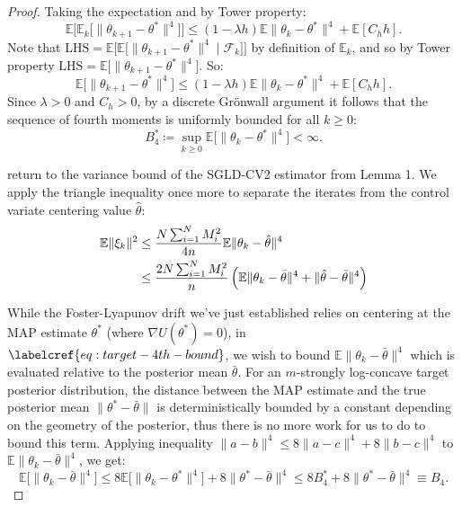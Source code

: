 \begin{proof}
Taking the expectation and by Tower property:
\begin{equation}
     \mathbb{E}\big[\mathbb{E}_k\big[\|\theta_{k+1} - \theta^*\|^4\big]\big] \leq (1 - \lambda h)\mathbb{E}\|\theta_k - \theta^*\|^4 + \mathbb{E}[C_h h].
\end{equation}
Note that LHS$=\mathbb{E}\big[\mathbb{E}\big[\|\theta_{k+1} - \theta^*\|^4 \mid \mathcal{F}_k\big]\big]$ by definition of $\mathbb{E}_k$, and so by Tower property $\text{LHS}=\mathbb{E}\big[\|\theta_{k+1} - \theta^*\|^4 \big]$. So:
\begin{equation}
     \mathbb{E}\big[\|\theta_{k+1} - \theta^*\|^4 \big] \leq (1 - \lambda h)\mathbb{E}\|\theta_k - \theta^*\|^4 + \mathbb{E}[C_h h].
\end{equation}
Since $\lambda > 0$ and $C_h > 0$, by a discrete Gr\"onwall argument it follows that the sequence of fourth moments is uniformly bounded for all $k \geq 0$:
\begin{equation}
    B_4^* \coloneqq \sup_{k \geq 0} \mathbb{E}\big[\|\theta_k - \theta^*\|^4\big] < \infty.
\end{equation}

return to the variance bound of the SGLD-CV2 estimator from Lemma 1. We apply the triangle inequality once more to separate the iterates from the control variate centering value $\hat\theta$:
\begin{align}\label{eq:target-4th-bound}
    \mathbb{E}\|\xi_k\|^2 &\leq \frac{N \sum_{i=1}^N M_i^2}{4n} \mathbb{E}\|\theta_k - \hat\theta\|^4 \notag\\
    &\leq \frac{2N \sum_{i=1}^N M_i^2}{n} \left( \mathbb{E}\|\theta_k - \bar\theta\|^4 + \|\hat\theta - \bar\theta\|^4 \right)
\end{align}

While the Foster-Lyapunov drift we've just established relies on centering at the MAP estimate $\theta^*$ (where $\nabla U(\theta^*) = 0$), in $\labelcref{eq:target-4th-bound}$, we wish to bound $\mathbb{E}\|\theta_k - \bar\theta\|^4$ which is evaluated relative to the posterior mean $\bar\theta$. For an $m$-strongly log-concave target posterior distribution, the distance between the MAP estimate and the true posterior mean $\|\theta^* - \bar\theta\|$ is deterministically bounded by a constant depending on the geometry of the posterior, thus there is no more work for us to do to bound this term. Applying inequality $\|a - b\|^4 \leq 8\|a - c\|^4 + 8\|b - c\|^4$ to $\mathbb{E}\|\theta_k - \bar\theta\|^4$, we get:
\begin{equation}
    \mathbb{E}\big[\|\theta_k - \bar\theta\|^4\big] \leq 8\mathbb{E}\big[\|\theta_k - \theta^*\|^4\big] + 8\|\theta^* - \bar\theta\|^4 \leq 8 B_4^* + 8\|\theta^* - \bar\theta\|^4 \equiv B_4.
\end{equation}


\end{proof}

